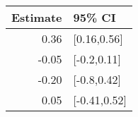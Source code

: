 \begin{tabular}{rl}
  \hline
Estimate & 95\% CI \\ 
  \hline
0.36 & [0.16,0.56] \\ 
  -0.05 & [-0.2,0.11] \\ 
  -0.20 & [-0.8,0.42] \\ 
  0.05 & [-0.41,0.52] \\ 
   \hline
\end{tabular}

